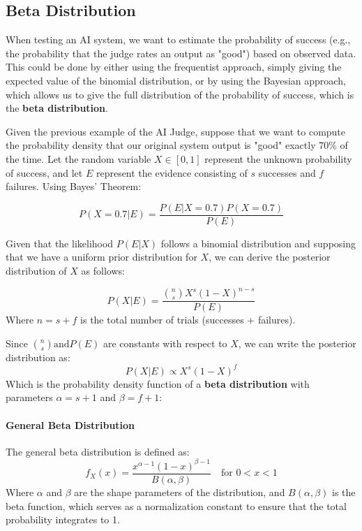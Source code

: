 \subsection{Beta Distribution}
When testing an AI system, we want to estimate the probability of success 
(e.g., the probability that the judge rates an output as "good") based on observed data. 
This could be done by either using the frequentist approach, simply giving the expected value of the binomial distribution, 
or by using the Bayesian approach, which allows us to give the full distribution of the probability of success, 
which is the \textbf{beta distribution}.

Given the previous example of the AI Judge, suppose that we want to compute the probability density that our original system output is "good" exactly 70\% of the time. 
Let the random variable $X \in [0, 1]$ represent the unknown probability of success, 
and let $E$ represent the evidence consisting of $s$ successes and $f$ failures. Using Bayes' Theorem:

\begin{equation}
    P(X = 0.7 | E) = \frac{P(E | X = 0.7) P(X = 0.7)}{P(E)}
\end{equation}

Given that the likelihood $P(E|X)$ follows a binomial distribution and supposing that we have a uniform prior distribution for $X$, we can derive the posterior distribution of $X$ as follows:

\begin{equation}
    P(X | E) = \frac{\binom{n}{s} X^s (1-X)^{n-s}}{P(E)}
\end{equation}
Where $n = s + f$ is the total number of trials (successes + failures).

Since $\binom{n}{s} \text{and} P(E)$ are constants with respect to $X$, we can write the posterior distribution as:
\begin{equation}
    P(X | E) \propto X^s (1-X)^{f}
\end{equation}
Which is the probability density function of a \textbf{beta distribution} with parameters $\alpha = s + 1$ and $\beta = f + 1$:

\paragraph{General Beta Distribution}
The general beta distribution is defined as:
\begin{equation}
    f_X(x) = \frac{x^{\alpha - 1} (1-x)^{\beta - 1}}{B(\alpha, \beta)} \quad \text{for } 0 < x < 1
\end{equation}
Where $\alpha$ and $\beta$ are the shape parameters of the distribution, and 
$B(\alpha, \beta)$ is the beta function, which serves as a normalization constant to ensure that the total probability integrates to 1.

